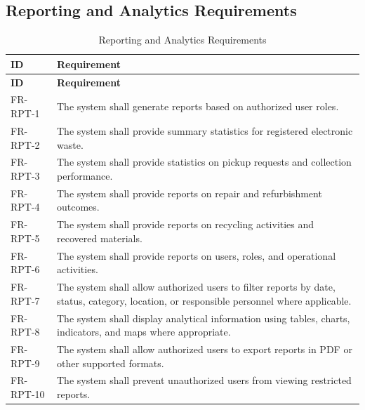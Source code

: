 \subsection{Reporting and Analytics Requirements}
\begin{longtable}{@{}p{2.4cm}p{11cm}@{}}
\caption{Reporting and Analytics Requirements} \label{tab:fr-rpt} \\
\toprule \textbf{ID} & \textbf{Requirement} \\ \midrule
\endfirsthead
\toprule \textbf{ID} & \textbf{Requirement} \\ \midrule
\endhead
FR-RPT-1 & The system shall generate reports based on authorized user roles. \\
FR-RPT-2 & The system shall provide summary statistics for registered electronic waste. \\
FR-RPT-3 & The system shall provide statistics on pickup requests and collection performance. \\
FR-RPT-4 & The system shall provide reports on repair and refurbishment outcomes. \\
FR-RPT-5 & The system shall provide reports on recycling activities and recovered materials. \\
FR-RPT-6 & The system shall provide reports on users, roles, and operational activities. \\
FR-RPT-7 & The system shall allow authorized users to filter reports by date, status, category, location, or responsible personnel where applicable. \\
FR-RPT-8 & The system shall display analytical information using tables, charts, indicators, and maps where appropriate. \\
FR-RPT-9 & The system shall allow authorized users to export reports in PDF or other supported formats. \\
FR-RPT-10 & The system shall prevent unauthorized users from viewing restricted reports. \\
\bottomrule
\end{longtable}

